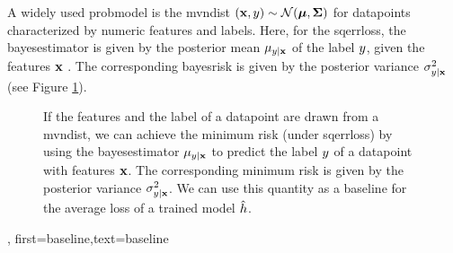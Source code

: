{{A widely used \gls{probmodel} is the \gls{mvndist} $\left( {\bf x},y \right) \sim \mathcal{N}({\bm \mu},{\bm \Sigma})$ 
for \gls{datapoint}s characterized by numeric \gls{feature}s and \gls{label}s.
Here, for the \gls{sqerrloss}, the \gls{bayesestimator} is given by the posterior 
\gls{mean} $\mu_{y|{\bf x}}$ of the \gls{label} $y$, given the 
\gls{feature}s ${\bf x}$ \cite{LC,GrayProbBook}. The corresponding \gls{bayesrisk} 
is given by the posterior \gls{variance} 
$\sigma^{2}_{y|{\bf x}}$ (see Figure \ref{fig_post_baseline_dict}).
	\begin{figure}[H]
		\begin{center}
		\end{center}
		\caption{If the \gls{feature}s and the \gls{label} of a \gls{datapoint} are drawn from a \gls{mvndist}, we 
		can achieve the \gls{minimum} \gls{risk} (under \gls{sqerrloss}) by using the \gls{bayesestimator} $\mu_{y|{\bf x}}$ 
		to predict the \gls{label} $y$ of a \gls{datapoint} with \gls{feature}s ${\bf x}$. The corresponding 
		\gls{minimum} \gls{risk} is given by the posterior \gls{variance} $\sigma^{2}_{y|{\bf x}}$. We can use 
		this quantity as a baseline for the average \gls{loss} of a trained \gls{model} $\hat{h}$. \label{fig_post_baseline_dict}}
	\end{figure}},
    first={baseline},text={baseline}
}

